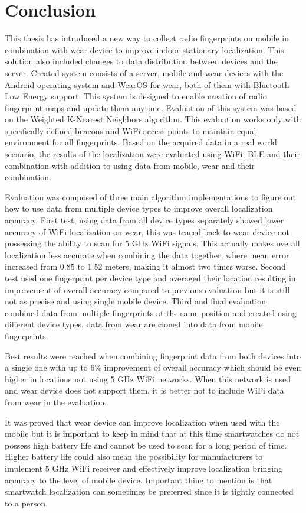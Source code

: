 \chapter{Conclusion}\label{sec:Conclusion}
This thesis has introduced a new way to collect radio fingerprints on mobile in combination with wear device to improve indoor stationary localization. This solution also included changes to data distribution between devices and the server. Created system consists of a server, mobile and wear devices with the Android operating system and WearOS for wear, both of them with Bluetooth Low Energy support. This system is designed to enable creation of radio fingerprint maps and update them anytime. Evaluation of this system was based on the Weighted K-Nearest Neighbors algorithm. This evaluation works only with specifically defined beacons and WiFi access-points to maintain equal environment for all fingerprints. Based on the acquired data in a real world scenario, the results of the localization were evaluated using WiFi, BLE and their combination with addition to using data from mobile, wear and their combination.

Evaluation was composed of three main algorithm implementations to figure out how to use data from multiple device types to improve overall localization accuracy. First test, using data from all device types separately showed lower accuracy of WiFi localization on wear, this was traced back to wear device not possessing the ability to scan for 5 GHz WiFi signals. This actually makes overall localization less accurate when combining the data together, where mean error increased from 0.85 to 1.52 meters, making it almost two times worse. Second test used one fingerprint per device type and averaged their location resulting in improvement of overall accuracy compared to previous evaluation but it is still not as precise and using single mobile device. Third and final evaluation combined data from multiple fingerprints at the same position and created using different device types, data from wear are cloned into data from mobile fingerprints.

Best results were reached when combining fingerprint data from both devices into a single one with up to 6\% improvement of overall accuracy which should be even higher in locations not using 5 GHz WiFi networks. When this network is used and wear device does not support them, it is better not to include WiFi data from wear in the evaluation.

It was proved that wear device can improve localization when used with the mobile but it is important to keep in mind that at this time smartwatches do not possess high battery life and cannot be used to scan for a long period of time. Higher battery life could also mean the possibility for manufacturers to implement 5 GHz WiFi receiver and effectively improve localization bringing accuracy to the level of mobile device. Important thing to mention is that smartwatch localization can sometimes be preferred since it is tightly connected to a person.

